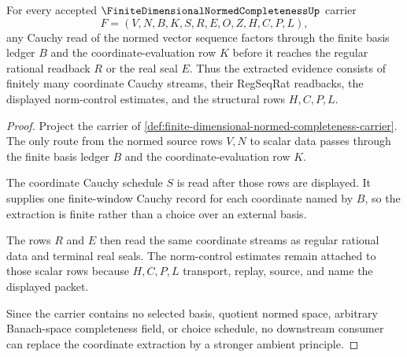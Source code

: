 \begin{theorem}
\label{thm:finite-dimensional-normed-completeness-cauchy-coordinate}
For every accepted $\FiniteDimensionalNormedCompletenessUp$ carrier
$$
F=(V,N,B,K,S,R,E,O,Z,H,C,P,L),
$$
any Cauchy read of the normed vector sequence factors through the finite basis ledger $B$ and the coordinate-evaluation row $K$ before it reaches the regular rational readback $R$ or the real seal $E$. Thus the extracted evidence consists of finitely many coordinate Cauchy streams, their RegSeqRat readbacks, the displayed norm-control estimates, and the structural rows $H,C,P,L$.
\end{theorem}
\begin{proof}
Project the carrier of \autoref{def:finite-dimensional-normed-completeness-carrier}. The only route from the normed source rows $V,N$ to scalar data passes through the finite basis ledger $B$ and the coordinate-evaluation row $K$.

The coordinate Cauchy schedule $S$ is read after those rows are displayed. It supplies one finite-window Cauchy record for each coordinate named by $B$, so the extraction is finite rather than a choice over an external basis.

The rows $R$ and $E$ then read the same coordinate streams as regular rational data and terminal real seals. The norm-control estimates remain attached to those scalar rows because $H,C,P,L$ transport, replay, source, and name the displayed packet.

Since the carrier contains no selected basis, quotient normed space, arbitrary Banach-space completeness field, or choice schedule, no downstream consumer can replace the coordinate extraction by a stronger ambient principle.
\end{proof}


